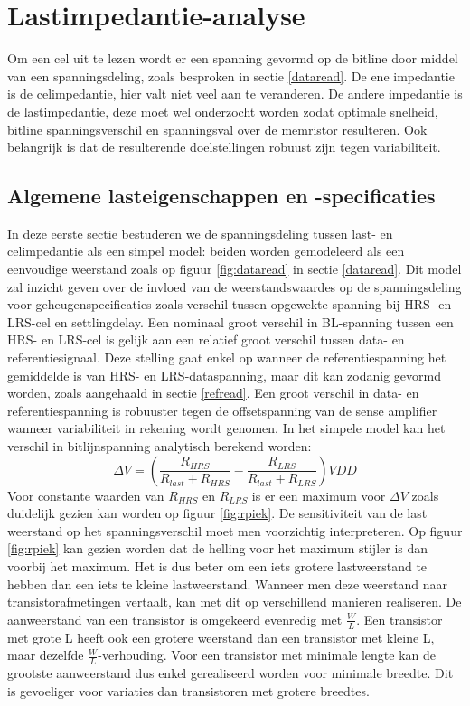\chapter{Lastimpedantie-analyse}
\label{loadanalysis}
Om een cel uit te lezen wordt er een spanning gevormd op de bitline door middel van een spanningsdeling, zoals besproken in sectie \ref{dataread}. De ene impedantie is de celimpedantie, hier valt niet veel aan te veranderen. De andere impedantie is de lastimpedantie, deze moet wel onderzocht worden zodat optimale snelheid, bitline spanningsverschil en spanningsval over de memristor resulteren.
Ook belangrijk is dat de resulterende doelstellingen robuust zijn tegen variabiliteit.

\section{Algemene lasteigenschappen en -specificaties}\label{sec:simplemodel}
In deze eerste sectie bestuderen we de spanningsdeling tussen last- en celimpedantie als een simpel model: beiden worden gemodeleerd als een eenvoudige weerstand zoals op figuur \ref{fig:dataread} in sectie \ref{dataread}. Dit model zal inzicht geven over de invloed van de weerstandswaardes op de spanningsdeling voor geheugenspecificaties zoals verschil tussen opgewekte spanning bij HRS- en LRS-cel en settlingdelay.
Een nominaal groot verschil in BL-spanning tussen een HRS- en LRS-cel is gelijk aan een relatief groot verschil tussen data- en referentiesignaal. Deze stelling gaat enkel op wanneer de referentiespanning het gemiddelde is van HRS- en LRS-dataspanning, maar dit kan zodanig gevormd worden, zoals aangehaald in sectie \ref{refread}. Een groot verschil in data- en referentiespanning is robuuster tegen de offsetspanning van de sense amplifier wanneer variabiliteit in rekening wordt genomen. In het simpele model kan het verschil in bitlijnspanning analytisch berekend worden:
\begin{equation}
 \Delta V = (\frac{R_{HRS}}{R_{last}+R_{HRS}} - \frac{R_{LRS}}{R_{last}+R_{LRS}})VDD
\end{equation} 
Voor constante waarden van $R_{HRS}$ en $R_{LRS}$ is er een maximum voor $ \Delta V$ zoals duidelijk gezien kan worden op figuur \ref{fig:rpiek}. De sensitiviteit van de last weerstand op het spanningsverschil moet men voorzichtig interpreteren. Op figuur \ref{fig:rpiek} kan gezien worden dat de helling voor het maximum stijler is dan voorbij het maximum. Het is dus beter om een iets grotere lastweerstand te hebben dan een iets te kleine lastweerstand. Wanneer men deze weerstand naar transistorafmetingen vertaalt, kan met dit op verschillend manieren realiseren. De aanweerstand van een transistor is omgekeerd evenredig met $\frac{W}{L}$. Een transistor met grote L heeft ook een grotere weerstand dan een transistor met kleine L, maar dezelfde $\frac{W}{L}$-verhouding. Voor een transistor met minimale lengte kan de grootste aanweerstand dus enkel gerealiseerd worden voor minimale breedte. Dit is gevoeliger voor variaties dan transistoren met grotere breedtes.\\
